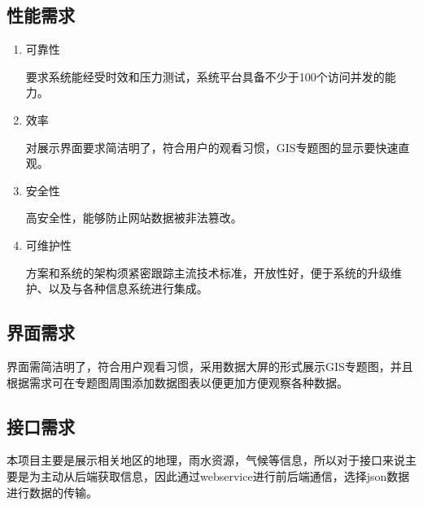 \subsection{性能需求}

\begin{enumerate}
	\item{可靠性}
	
	要求系统能经受时效和压力测试，系统平台具备不少于100个访问并发的能力。
	
	\item{效率}
	
	对展示界面要求简洁明了，符合用户的观看习惯，GIS专题图的显示要快速直观。
	
	\item{安全性}
	
	高安全性，能够防止网站数据被非法篡改。
	
	\item{可维护性}
	
	方案和系统的架构须紧密跟踪主流技术标准，开放性好，便于系统的升级维护、以及与各种信息系统进行集成。
\end{enumerate}


\subsection{界面需求}

界面需简洁明了，符合用户观看习惯，采用数据大屏的形式展示GIS专题图，并且根据需求可在专题图周围添加数据图表以便更加方便观察各种数据。

\subsection{接口需求}

本项目主要是展示相关地区的地理，雨水资源，气候等信息，所以对于接口来说主要是为主动从后端获取信息，因此通过webservice进行前后端通信，选择json数据进行数据的传输。





